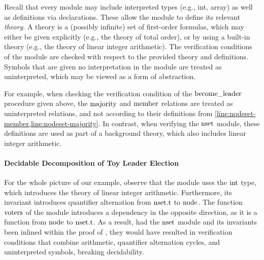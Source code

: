 Recall that every module may include interpreted types (e.g., int, array)
as well as definitions via  declarations.
These allow the module to define its relevant \emph{theory}.
A theory is a (possibly infinite) set of first-order formulas, which may either be given explicitly (e.g., the theory of total order), or by using a built-in theory (e.g., the theory of linear integer arithmetic).
The verification conditions of the module are checked with respect to the provided theory and definitions.
Symbols that are given no interpretation in the module are treated as uninterpreted,
which may be viewed as a form of abstraction.

For example, when checking the verification condition of the
${\text{become\_leader}}$ procedure given above, the ${\text{majority}}$ and
${\text{member}}$ relations are treated as uninterpreted relations, and not
according to their definitions from 
\cref{line:nodeset-member,line:nodeset-majority}. In contrast, when
verifying the ${\text{nset}}$ module, these definitions are used as part
of a background theory, which also includes linear integer arithmetic.

\paragraph{Decidable Decomposition of Toy Leader Election}

For the whole picture of our example, observe that the {\mnodeset} module uses the ${\text{int}}$ type, which introduces the theory of linear integer arithmetic.
Furthermore, its {\iintersect} invariant introduces quantifier alternation from ${\text{nset.t}}$ to ${\text{node}}$.
The function ${\text{voters}}$ of the {\mtoysystem} module introduces a dependency in the opposite direction, as it is a function from ${\text{node}}$ to ${\text{nset.t}}$.
As a result, had the ${\text{nset}}$ module and its invariants been inlined within the proof of {\mtoysystem}, they would have resulted in verification conditions that combine arithmetic, quantifier alternation cycles, and uninterpreted symbols, breaking decidability.

